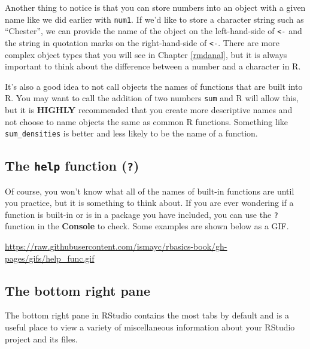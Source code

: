 \documentclass[]{tufte-book}
\theoremstyle{definition}
\theoremstyle{definition}
\theoremstyle{remark}
\begin{document}
Another thing to notice is that you can store numbers into an object
with a given name like we did earlier with \texttt{num1}. If we'd like
to store a character string such as ``Chester'', we can provide the name
of the object on the left-hand-side of \texttt{\textless{}-} and the
string in quotation marks on the right-hand-side of
\texttt{\textless{}-}. There are more complex object types that you will
see in Chapter \ref{rmdanal}, but it is always important to think about
the difference between a number and a character in R.

It's also a good idea to not call objects the names of functions that
are built into R. You may want to call the addition of two numbers
\texttt{sum} and R will allow this, but it is \textbf{HIGHLY}
recommended that you create more descriptive names and not choose to
name objects the same as common R functions. Something like
\texttt{sum\_densities} is better and less likely to be the name of a
function.

\subsection{\texorpdfstring{The \texttt{help} function
(\texttt{?})}{The help function (?)}}\label{the-help-function}

Of course, you won't know what all of the names of built-in functions
are until you practice, but it is something to think about. If you are
ever wondering if a function is built-in or is in a package you have
included, you can use the \texttt{?} function in the \textbf{Console} to
check. Some examples are shown below as a GIF.

\vspace{0.1in}

\begin{center}\footnotesize{\url{https://raw.githubusercontent.com/ismayc/rbasics-book/gh-pages/gifs/help_func.gif}}\end{center}

\vspace{0.1in}

\subsection{The bottom right pane}\label{the-bottom-right-pane}

The bottom right pane in RStudio contains the most tabs by default and
is a useful place to view a variety of miscellaneous information about
your RStudio project and its files.
\end{document}
